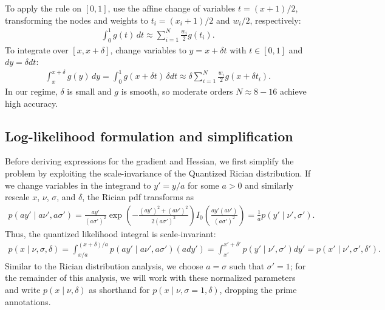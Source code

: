 \documentclass{article}
\begin{document}
To apply the rule on $[0,1]$, use the affine change of variables $t = (x+1)/2$, transforming the nodes and weights to $t_i = (x_i+1)/2$ and $w_i/2$, respectively:
%
\begin{align}
  \int_{0}^{1} g(t) \, dt \approx \sum_{i=1}^{N} \frac{w_i}{2} g(t_i).
\end{align}
%
To integrate over $[x, x+\delta]$, change variables to $y = x + \delta t$ with $t\in[0,1]$ and $dy = \delta dt$:
%
\begin{align}
  \int_{x}^{x+\delta} g(y) \, dy = \int_{0}^{1} g(x + \delta t) \, \delta dt
  \approx \delta \sum_{i=1}^{N} \frac{w_i}{2} g(x + \delta t_i).
\end{align}
%
In our regime, $\delta$ is small and $g$ is smooth, so moderate orders $N \approx 8\!-\!16$ achieve high accuracy.

\subsection{Log-likelihood formulation and simplification}

Before deriving expressions for the gradient and Hessian, we first simplify the problem by exploiting the scale-invariance of the Quantized Rician distribution.
If we change variables in the integrand to $y' = y / a$ for some $a > 0$ and similarly rescale $x$, $\nu$, $\sigma$, and $\delta$, the Rician pdf transforms as
%
\begin{align}
  p(a y' \mid a \nu', a \sigma')
  = \frac{a y'}{(a \sigma')^2} \exp\left(-\frac{(a y')^2+(a \nu')^2}{2(a \sigma')^2}\right) I_0\left(\frac{a y' (a \nu')}{(a \sigma')^2}\right)
  = \frac{1}{a} p(y' \mid \nu', \sigma').
\end{align}
%
Thus, the quantized likelihood integral is scale-invariant:
%
\begin{align}
  p(x \mid \nu, \sigma, \delta)
  = \int_{x/a}^{(x+\delta)/a} p(a y' \mid a\nu', a\sigma') (a dy') = \int_{x'}^{x'+\delta'} p(y' \mid \nu', \sigma') dy'
  = p(x' \mid \nu', \sigma', \delta').
\end{align}
%
Similar to the Rician distribution analysis, we choose $a = \sigma$ such that $\sigma'=1$;
for the remainder of this analysis, we will work with these normalized parameters and write $p(x \mid \nu, \delta)$ as shorthand for $p(x \mid \nu, \sigma=1, \delta)$, dropping the prime annotations.
\end{document}
